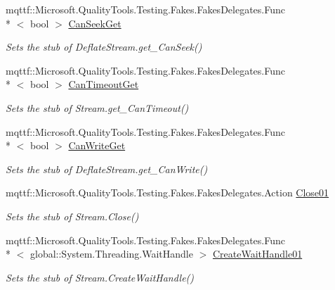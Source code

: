 \begin{DoxyCompactItemize}
mqttf\-::\-Microsoft.\-Quality\-Tools.\-Testing.\-Fakes.\-Fakes\-Delegates.\-Func\\*
$<$ bool $>$ \hyperlink{class_system_1_1_i_o_1_1_compression_1_1_fakes_1_1_stub_deflate_stream_a260f9c1f7f095750f02e76872266ee18}{Can\-Seek\-Get}
\begin{DoxyCompactList}\small\item\em Sets the stub of Deflate\-Stream.\-get\-\_\-\-Can\-Seek()\end{DoxyCompactList}\item 
mqttf\-::\-Microsoft.\-Quality\-Tools.\-Testing.\-Fakes.\-Fakes\-Delegates.\-Func\\*
$<$ bool $>$ \hyperlink{class_system_1_1_i_o_1_1_compression_1_1_fakes_1_1_stub_deflate_stream_a02d7a410006c48202267078e3c3d3324}{Can\-Timeout\-Get}
\begin{DoxyCompactList}\small\item\em Sets the stub of Stream.\-get\-\_\-\-Can\-Timeout()\end{DoxyCompactList}\item 
mqttf\-::\-Microsoft.\-Quality\-Tools.\-Testing.\-Fakes.\-Fakes\-Delegates.\-Func\\*
$<$ bool $>$ \hyperlink{class_system_1_1_i_o_1_1_compression_1_1_fakes_1_1_stub_deflate_stream_a870c0f53dee716481e4b3d9099e092d5}{Can\-Write\-Get}
\begin{DoxyCompactList}\small\item\em Sets the stub of Deflate\-Stream.\-get\-\_\-\-Can\-Write()\end{DoxyCompactList}\item 
mqttf\-::\-Microsoft.\-Quality\-Tools.\-Testing.\-Fakes.\-Fakes\-Delegates.\-Action \hyperlink{class_system_1_1_i_o_1_1_compression_1_1_fakes_1_1_stub_deflate_stream_a1f5090237c142c371f640921e8f24520}{Close01}
\begin{DoxyCompactList}\small\item\em Sets the stub of Stream.\-Close()\end{DoxyCompactList}\item 
mqttf\-::\-Microsoft.\-Quality\-Tools.\-Testing.\-Fakes.\-Fakes\-Delegates.\-Func\\*
$<$ global\-::\-System.\-Threading.\-Wait\-Handle $>$ \hyperlink{class_system_1_1_i_o_1_1_compression_1_1_fakes_1_1_stub_deflate_stream_a39c05aa42e9aeaf462102de98164e5a6}{Create\-Wait\-Handle01}
\begin{DoxyCompactList}\small\item\em Sets the stub of Stream.\-Create\-Wait\-Handle()\end{DoxyCompactList}\item 

\end{DoxyCompactItemize}
